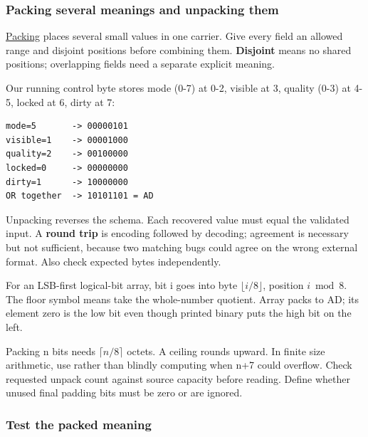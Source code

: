 \subsubsection{Packing several meanings and unpacking them}\label{01-foundations-i-ch001-packing-several-meanings-and-unpacking-them}

\hypertarget{01-foundations-i-ch001-packing-several-meanings-and-unpacking-them}{}

\hyperref[appendix-1f9963e1a5d1]{Packing} places several small values in one carrier. Give every field an allowed range and disjoint positions before combining them. \textbf{Disjoint} means no shared positions; overlapping fields need a separate explicit meaning.

Our running control byte stores mode (0-7) at 0-2, visible at 3, quality (0-3) at 4-5, locked at 6, dirty at 7:

\begin{verbatim}
mode=5       -> 00000101
visible=1    -> 00001000
quality=2    -> 00100000
locked=0     -> 00000000
dirty=1      -> 10000000
OR together  -> 10101101 = AD
\end{verbatim}

Unpacking reverses the schema. Each recovered value must equal the validated input. A \textbf{round trip} is encoding followed by decoding; agreement is necessary but not sufficient, because two matching bugs could agree on the wrong external format. Also check expected bytes independently.

For an LSB-first logical-bit array, bit i goes into byte \(\lfloor i/8\rfloor\), position \(i\bmod8\). The floor symbol means take the whole-number quotient. Array \BookInlineCode{{{[}}{1}{,}{0}{,}{1}{,}{1}{,}{0}{,}{1}{,}{0}{,}{1}{{]}}}{{[}1,0,1,1,0,1,0,1{]}} packs to AD; its element zero is the low bit even though printed binary puts the high bit on the left.

Packing n bits needs \(\lceil n/8\rceil\) octets. A ceiling rounds upward. In finite size arithmetic, use  rather than blindly computing  when n+7 could overflow. Check requested unpack count against source capacity before reading. Define whether unused final padding bits must be zero or are ignored.

\subsubsection{Test the packed meaning}\label{01-foundations-i-ch001-test-the-packed-meaning}

